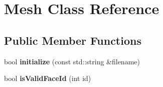 \hypertarget{class_mesh}{}\section{Mesh Class Reference}
\label{class_mesh}
\subsection*{Public Member Functions}
\begin{DoxyCompactItemize}
\item 
\hypertarget{class_mesh_ad93d51d3938b1fe01816746f7d6a121f}{}bool {\bfseries initialize} (const std\+::string \&filename)\label{class_mesh_ad93d51d3938b1fe01816746f7d6a121f}

\item 
\hypertarget{class_mesh_aaa92d27cfbbb7b2ae11d94ded72de982}{}bool {\bfseries is\+Valid\+Face\+Id} (int id)\label{class_mesh_aaa92d27cfbbb7b2ae11d94ded72de982}

\end{DoxyCompactItemize}
